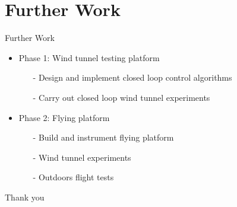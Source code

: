 \documentclass[aspectratio=169]{beamer}            %
\begin{document}
\section{Further Work}
\begin{frame}{Further Work}

  \pause
  \begin{itemize}[<+->]
    \item Phase 1: Wind tunnel testing platform
      \begin{itemize}[<+->]
      \item[-]Design and implement closed loop control algorithms
      \item[-]Carry out closed loop wind tunnel experiments
      \end{itemize}
	
    \item Phase 2: Flying platform
      \begin{itemize}[<+->]
			\item[-]Build and instrument flying platform
      \item[-]Wind tunnel experiments
      \item[-]Outdoors flight tests
      \end{itemize}
  \end{itemize}
	
\end{frame}

\begin{frame}{}

  \centering
	\Huge{Thank you}

\end{frame}

\end{document}
